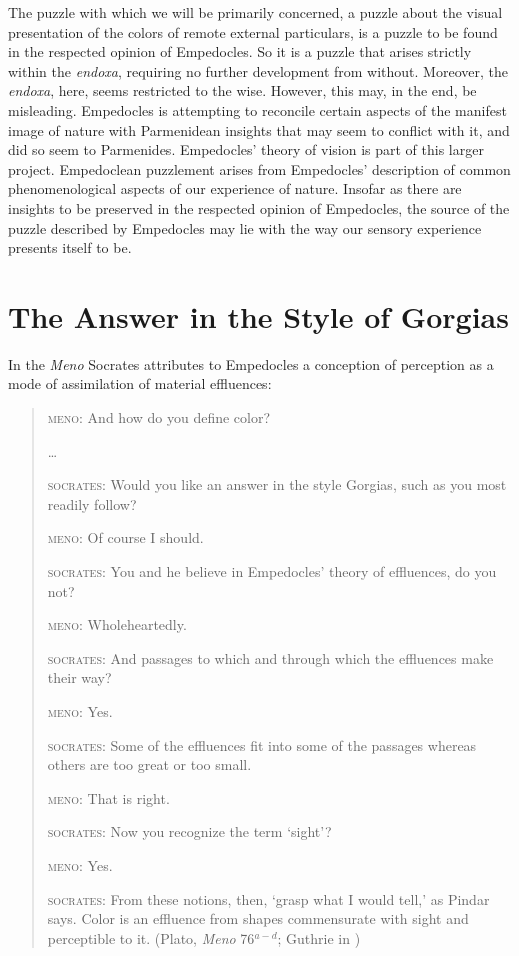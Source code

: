 The puzzle with which we will be primarily concerned, a puzzle about the visual presentation of the colors of remote external particulars, is a puzzle to be found in the respected opinion of Empedocles. So it is a puzzle that arises strictly within the \emph{endoxa}, requiring no further development from without. Moreover, the \emph{endoxa}, here, seems restricted to the wise. However, this may, in the end, be misleading. Empedocles is attempting to reconcile certain aspects of the manifest image of nature with Parmenidean insights that may seem to conflict with it, and did so seem to Parmenides. Empedocles' theory of vision is part of this larger project. Empedoclean puzzlement arises from Empedocles' description of common phenomenological aspects of our experience of nature. Insofar as there are insights to be preserved in the respected opinion of Empedocles, the source of the puzzle described by Empedocles may lie with the way our sensory experience presents itself to be.


\section{The Answer in the Style of Gorgias} %
\label{sec:the_answer_in_the_style_of_gorgias}

In the \emph{Meno} Socrates attributes to Empedocles a conception of perception as a mode of assimilation of material effluences:
\begin{quotation}
    \textsc{meno}: And how do you define color?
    
    \ldots
    
    \textsc{socrates}: Would you like an answer in the style Gorgias, such as you most readily follow?
    
    \textsc{meno}: Of course I should.
    
    \textsc{socrates}: You and he believe in Empedocles' theory of effluences, do you not?
    
    \textsc{meno}: Wholeheartedly.
    
    \textsc{socrates}: And passages to which and through which the effluences make their way?
    
    \textsc{meno}: Yes.
    
    \textsc{socrates}: Some of the effluences fit into some of the passages whereas others are too great or too small.
    
    \textsc{meno}: That is right.
    
    \textsc{socrates}: Now you recognize the term `sight'?
    
    \textsc{meno}: Yes.
    
    \textsc{socrates}: From these notions, then, `grasp what I would tell,' as Pindar says. Color is an effluence from shapes commensurate with sight and perceptible to it. (Plato, \emph{Meno} 76\( ^{a-d} \); Guthrie in \citealt[359]{Hamilton:1989fk})
\end{quotation}

